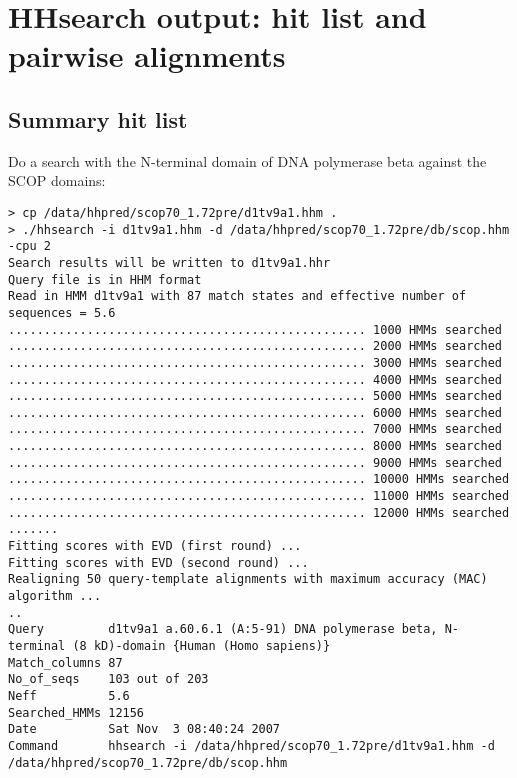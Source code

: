 \documentclass[11pt,a4paper]{article}
\begin{document}
\section{HHsearch output: hit list and pairwise alignments}

\subsection{Summary hit list}

Do a search with the N-terminal domain of DNA polymerase beta against the SCOP domains:


\scriptsize\begin{verbatim}
> cp /data/hhpred/scop70_1.72pre/d1tv9a1.hhm .
> ./hhsearch -i d1tv9a1.hhm -d /data/hhpred/scop70_1.72pre/db/scop.hhm -cpu 2
Search results will be written to d1tv9a1.hhr
Query file is in HHM format
Read in HMM d1tv9a1 with 87 match states and effective number of sequences = 5.6
.................................................. 1000 HMMs searched
.................................................. 2000 HMMs searched
.................................................. 3000 HMMs searched
.................................................. 4000 HMMs searched
.................................................. 5000 HMMs searched
.................................................. 6000 HMMs searched
.................................................. 7000 HMMs searched
.................................................. 8000 HMMs searched
.................................................. 9000 HMMs searched
.................................................. 10000 HMMs searched
.................................................. 11000 HMMs searched
.................................................. 12000 HMMs searched
.......
Fitting scores with EVD (first round) ...
Fitting scores with EVD (second round) ...
Realigning 50 query-template alignments with maximum accuracy (MAC) algorithm ...
..
Query         d1tv9a1 a.60.6.1 (A:5-91) DNA polymerase beta, N-terminal (8 kD)-domain {Human (Homo sapiens)} 
Match_columns 87
No_of_seqs    103 out of 203
Neff          5.6 
Searched_HMMs 12156
Date          Sat Nov  3 08:40:24 2007
Command       hhsearch -i /data/hhpred/scop70_1.72pre/d1tv9a1.hhm -d /data/hhpred/scop70_1.72pre/db/scop.hhm 


\end{verbatim}
\end{document}
